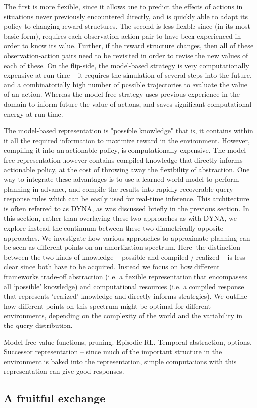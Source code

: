 The first is more flexible, since it allows one to predict the effects of actions in situations never previously encountered directly, and is quickly able to adapt its policy to changing reward structures. The second is less flexble since (in its most basic form), requires each observation-action pair to have been experienced in order to know its value. Further, if the reward structure changes, then all of these observation-action pairs need to be revisited in order to revise the new values of each of these. On the flip-side, the model-based strategy is very computationally expensive at run-time -- it requires the simulation of several steps into the future, and a combinatorially high number of possible trajectories to evaluate the value of an action. Whereas the model-free strategy uses previous experience in the domain to inform future the value of actions, and saves significant computational energy at run-time.

The model-based representation is "possible knowledge" that is, it contains within it all the required information to maximize reward in the environment. However, compiling it into an actionable policy, is computationally expensive. The model-free representation however contains compiled knowledge that directly informs actionable policy, at the cost of throwing away the flexibility of abstraction. One way to integrate these advantages is to use a learned world model to perform planning in advance, and compile the results into rapidly recoverable query-response rules which can be easily used for real-time inference. This architecture is often referred to as DYNA, as was discussed briefly in the previous section. In this section, rather than overlaying these two approaches as with DYNA, we explore instead the continuum between these two diametrically opposite approaches. We investigate how various approaches to approximate planning can be seen as different points on an amortization spectrum. Here, the distinction between the two kinds of knowledge -- possible and compiled / realized -- is less clear since both have to be acquired. Instead we focus on how different frameworks trade-off abstraction (i.e. a flexible representation that encompasses all `possible' knowledge) and computational resources (i.e. a compiled response that represents `realized' knowledge and directly informs strategies). We outline how different points on this spectrum might be optimal for different environments, depending on the complexity of the world and the variability in the query distribution.

Model-free value functions, pruning. Episodic RL.
Temporal abstraction, options. Successor representation -- since much of the important structure in the environment is baked into the representation, simple computations with this representation can give good responses. 

\subsection{A fruitful exchange}

